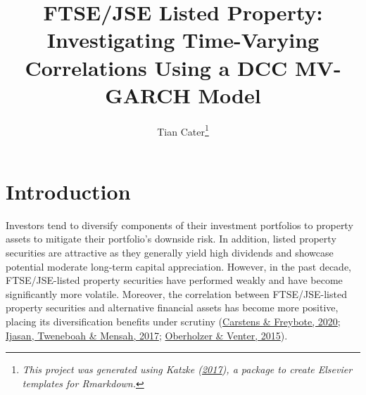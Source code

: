 \documentclass[11pt,preprint, authoryear]{elsarticle}
\numberwithin{equation}{section}
\numberwithin{figure}{section}
\numberwithin{table}{section}
\let\rmarkdownfootnote\footnote%
\def\footnote{\protect\rmarkdownfootnote}
\begin{document}
\begin{frontmatter}  %

\title{FTSE/JSE Listed Property: Investigating Time-Varying Correlations
Using a DCC MV-GARCH Model}





\author[Add1]{Tian Cater\footnote{\emph{This project was generated using
  Katzke (\protect\hyperlink{ref-Texevier}{2017}), a package to create
  Elsevier templates for Rmarkdown.}}}





\address[Add1]{Financial Econometrics 871 Project 2022}
\address[Add2]{University of Stellenbosch, Western Cape, South Africa}



\vspace{1cm}





\vspace{0.5cm}

\end{frontmatter}



\pagestyle{fancy}
\chead{}
\rhead{}
\lfoot{}
\lhead{}
\cfoot{}


\headsep 35pt %




\hypertarget{introduction}{%
\section{\texorpdfstring{Introduction
\label{Introduction}}{Introduction }}\label{introduction}}

Investors tend to diversify components of their investment portfolios to
property assets to mitigate their portfolio's downside risk. In
addition, listed property securities are attractive as they generally
yield high dividends and showcase potential moderate long-term capital
appreciation. However, in the past decade, FTSE/JSE-listed property
securities have performed weakly and have become significantly more
volatile. Moreover, the correlation between FTSE/JSE-listed property
securities and alternative financial assets has become more positive,
placing its diversification benefits under scrutiny
(\protect\hyperlink{ref-carstens2020pull}{Carstens \& Freybote, 2020};
\protect\hyperlink{ref-ijasan2017anti}{Ijasan, Tweneboah \& Mensah,
2017}; \protect\hyperlink{ref-oberholzer2015univariate}{Oberholzer \&
Venter, 2015}).
\end{document}

